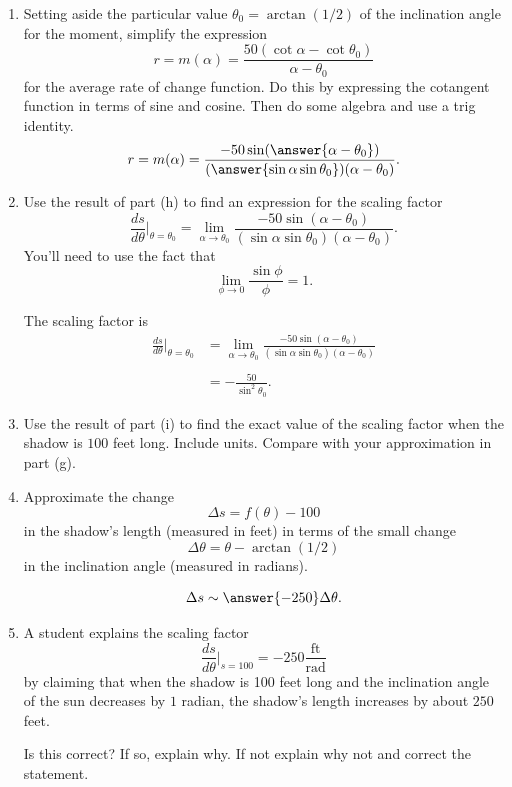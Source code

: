 \documentclass{ximera}
\begin{document}
\begin{question}
\begin{enumerate}
\begin{enumerate}
\end{enumerate}

\item Setting aside the particular value $\theta_0 = \arctan(1/2)$ of the inclination angle for the moment, simplify the expression
\[
   r = m(\alpha) = \frac{50(\cot \alpha  - \cot\theta_0)}{\alpha - \theta_0}
\]
for the average rate of change function. Do this by expressing the cotangent function in terms of sine and cosine. Then do some algebra and use a trig identity.  %
\[
   r = m(\alpha) = \frac{-50\sin(\answer{\alpha - \theta_0})}{(\answer{\sin\alpha \sin\theta_0})(\alpha - \theta_0)} .
\]

\item Use the result of part (h) to find an expression for the scaling factor
\[
  \frac{ds}{d\theta}\Big|_{\theta = \theta_0} = \lim_{\alpha \to \theta_0} \frac{-50\sin(\alpha - \theta_0)}{(\sin\alpha \sin\theta_0)(\alpha - \theta_0)}  .
\]
You'll need to use the fact that
\[
 \lim_{\phi \to 0} \frac{\sin\phi}{\phi} = 1.
\]

The scaling factor is
\begin{align*}
   \frac{ds}{d\theta}\Big|_{\theta = \theta_0}  &= \lim_{\alpha \to \theta_0} \frac{-50\sin(\alpha - \theta_0)}{(\sin\alpha \sin\theta_0)(\alpha - \theta_0)} \\ \\
                                                                    &= -\frac{50}{\sin^2\theta_0}.
\end{align*}

\item Use the result of part (i) to find the exact value of the scaling factor when the shadow is $100$ feet long. Include units. Compare with your approximation in part (g).

\item Approximate the change
\[
    \Delta s = f(\theta) - 100
\]
in the shadow's length (measured in feet) in terms of the small change
\[
 \Delta \theta = \theta - \arctan(1/2)
\]
in the inclination angle (measured in radians).

\[
       \Delta s \sim \answer{-250} \Delta \theta .
\]

\item A student explains the scaling factor
\[
   \frac{ds}{d\theta}\Big|_{s=100} = -250 \frac{\text{ft}}{\text{rad}}
\]
by claiming that when the shadow is 100 feet long and the inclination angle of the sun decreases by $1$ radian, the shadow's length  increases by about $250$ feet. 

Is this correct? If so, explain why. If not explain why not and correct the statement.
\begin{freeResponse}
\end{freeResponse}

\end{enumerate}
\end{question}
\end{document}
